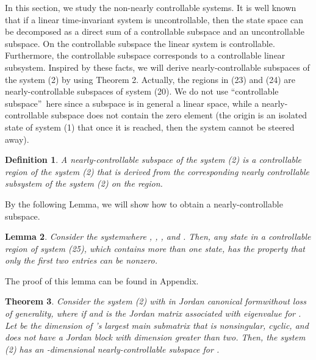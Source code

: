 \documentclass[journal,a4paper,12pt,onecolumn]{IEEEtran}
\newtheorem{theorem}{Theorem}
\newtheorem{definition}[theorem]{Definition}
\newtheorem{lemma}[theorem]{Lemma}
\begin{document}
In this section, we study the non-nearly controllable systems. It is well
known that if a linear time-invariant system is uncontrollable, then the
state space can be decomposed as a direct sum of a controllable subspace and
an uncontrollable subspace. On the controllable subspace the linear system
is controllable. Furthermore, the controllable subspace corresponds to a
controllable linear subsystem. Inspired by these facts, we will derive
nearly-controllable subspaces of the system (2) by using Theorem 2.
Actually, the regions in (23) and (24) are nearly-controllable subspaces of
system (20). We do not use \textquotedblleft controllable
subspace\textquotedblright\ here since a subspace is in general a linear
space, while a nearly-controllable subspace does not contain the zero
element (the origin is an isolated state of system (1) that once it is
reached, then the system cannot be steered away).



\begin{definition}
A nearly-controllable subspace of the system (2) is a controllable region of
the system (2) that is derived from the corresponding nearly controllable
subsystem of the system (2) on the region.
\end{definition}



By the following Lemma, we will show how to obtain a nearly-controllable
subspace.



\begin{lemma}
Consider the systemwhere , , , and . Then, any state in a controllable region of system
(25), which contains more than one state, has the property that only the
first two entries can be nonzero.
\end{lemma}



The proof of this lemma can be found in Appendix.



\begin{theorem}
Consider the system (2) with  in Jordan canonical formwithout loss of generality, where  if  and  is the Jordan matrix associated with
eigenvalue  for . Let  be the dimension of 's largest main submatrix that is nonsingular, cyclic, and does not have
a Jordan block with dimension greater than two. Then, the system (2) has an -dimensional nearly-controllable subspace for .
\end{theorem}
\end{document}
